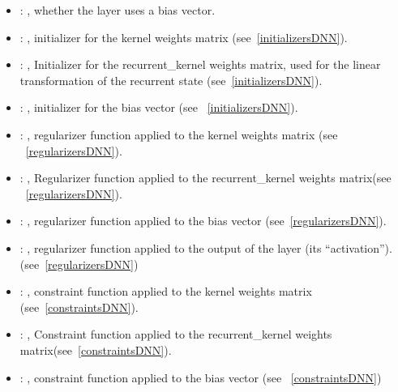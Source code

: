 \begin{itemize}
\begin{itemize}
        \item {}: , 
          whether the layer uses a bias vector.

        \item {}: , 
          initializer for the kernel weights matrix (see~\ref{initializersDNN}).

        \item {}: , 
          Initializer for the recurrent\_kernel weights matrix, used for the linear transformation
          of the         recurrent state (see~\ref{initializersDNN}).

        \item {}: , 
          initializer for the bias vector (see ~\ref{initializersDNN}).

        \item {}: , 
          regularizer function applied to the kernel weights matrix (see ~\ref{regularizersDNN}).

        \item {}: , 
          Regularizer function applied to the recurrent\_kernel weights matrix(see
          ~\ref{regularizersDNN}).

        \item {}: , 
          regularizer function applied to the bias vector (see~\ref{regularizersDNN}).

        \item {}: , 
          regularizer function applied to the output         of the layer (its ``activation'').
          (see~\ref{regularizersDNN})

        \item {}: , 
          constraint function applied to the kernel weights matrix (see~\ref{constraintsDNN}).

        \item {}: , 
          Constraint function applied to the recurrent\_kernel weights
          matrix(see~\ref{constraintsDNN}).

        \item {}: , 
          constraint function applied to the bias vector (see ~\ref{constraintsDNN})


\end{itemize}
\end{itemize}
